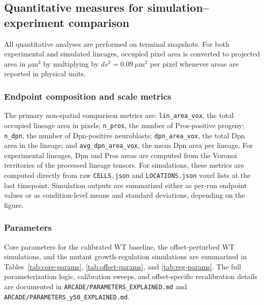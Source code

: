 \subsection{Quantitative measures for simulation--experiment comparison}

All quantitative analyses are performed on terminal snapshots.
For both experimental and simulated lineages, occupied pixel area is converted to projected area in \(\mu\mathrm{m}^2\) by multiplying by \(ds^2 = 0.09~\mu\mathrm{m}^2\) per pixel whenever areas are reported in physical units.

\subsubsection{Endpoint composition and scale metrics}

The primary non-spatial comparison metrics are:
\texttt{lin\_area\_vox}, the total occupied lineage area in pixels;
\texttt{n\_pros}, the number of Pros-positive progeny;
\texttt{n\_dpn}, the number of Dpn-positive neuroblasts;
\texttt{dpn\_area\_vox}, the total Dpn area in the lineage; and
\texttt{avg\_dpn\_area\_vox}, the mean Dpn area per lineage.
For experimental lineages, Dpn and Pros areas are computed from the Voronoi territories of the processed lineage tensors.
For simulations, these metrics are computed directly from raw \texttt{CELLS.json} and \texttt{LOCATIONS.json} voxel lists at the last timepoint.
Simulation outputs are summarized either as per-run endpoint values or as condition-level means and standard deviations, depending on the figure.

\subsubsection{Parameters}
Core parameters for the calibrated WT baseline, the offset-perturbed WT simulations, and the mutant growth-regulation simulations are summarized in Tables~\ref{tab:core-params}, \ref{tab:offset-params}, and \ref{tab:reg-params}.
The full parameterization logic, calibration sweeps, and offset-specific recalibration details are documented in \texttt{ARCADE/PARAMETERS\_EXPLAINED.md} and \texttt{ARCADE/PARAMETERS\_y50\_EXPLAINED.md}.


